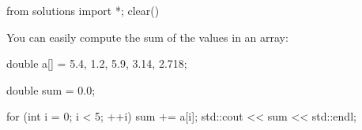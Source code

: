 \begin{python0}
from solutions import *; clear()
\end{python0}

You can easily compute the sum of the values in an array:

\begin{consolethree}[escapeinside=||]
double a[] = {5.4, 1.2, 5.9, 3.14, 2.718};

double sum = 0.0;

for (int i = 0; i < 5; ++i)
{
    sum += a[i];
    std::cout << sum << std::endl;
} 
\end{consolethree}




